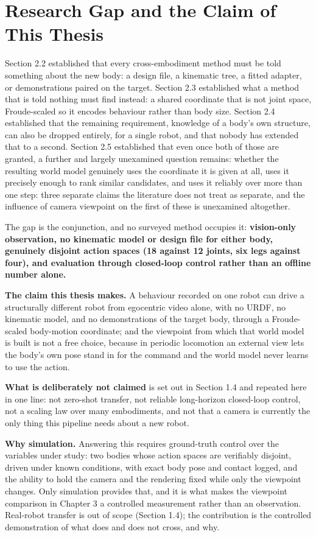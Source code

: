 \documentclass[12pt,a4paper,oneside]{report}
\begin{document}
\section{Research Gap and the Claim of This Thesis}
Section 2.2 established that every cross-embodiment method must be told something about the new body:
a design file, a kinematic tree, a fitted adapter, or demonstrations paired on the target. Section 2.3
established what a method that is told nothing must find instead: a shared coordinate that is not
joint space, Froude-scaled so it encodes behaviour rather than body size. Section 2.4 established that
the remaining requirement, knowledge of a body's own structure, can also be dropped entirely, for a
single robot, and that nobody has extended that to a second. Section 2.5 established that even once
both of those are granted, a further and largely unexamined question remains: whether the resulting
world model genuinely uses the coordinate it is given at all, uses it precisely enough to rank similar
candidates, and uses it reliably over more than one step: three separate claims the literature does
not treat as separate, and the influence of camera viewpoint on the first of these is
unexamined altogether.

The gap is the conjunction, and no surveyed method occupies it: \textbf{vision-only observation, no
kinematic model or design file for either body, genuinely disjoint action spaces (18 against 12
joints, six legs against four), and evaluation through closed-loop control rather than an offline
number alone.}

\noindent\textbf{The claim this thesis makes.} A behaviour recorded on one robot can drive a
structurally different robot from egocentric video alone, with no URDF, no kinematic model, and no
demonstrations of the target body, through a Froude-scaled body-motion coordinate; and the viewpoint
from which that world model is built is not a free choice, because in periodic locomotion an external
view lets the body's own pose stand in for the command and the world model never learns to use the
action.

\noindent\textbf{What is deliberately not claimed} is set out in Section 1.4 and repeated here in one
line: not zero-shot transfer, not reliable long-horizon closed-loop control, not a scaling law over
many embodiments, and not that a camera is currently the only thing this pipeline needs about a new
robot.

\noindent\textbf{Why simulation.} Answering this requires ground-truth control over the variables under
study: two bodies whose action spaces are verifiably disjoint, driven under known conditions, with
exact body pose and contact logged, and the ability to hold the camera and the rendering fixed while
only the viewpoint changes. Only simulation provides that, and it is what makes the viewpoint
comparison in Chapter 3 a controlled measurement rather than an observation. Real-robot transfer is
out of scope (Section 1.4); the contribution is the controlled demonstration of what does and does not
cross, and why.
\end{document}

